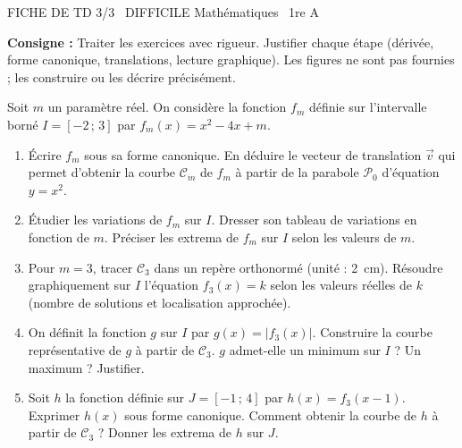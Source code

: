 \documentclass[11pt]{article}
\begin{document}
\begin{tcolorbox}[enhanced,colback=popink,colframe=popink,arc=10pt,boxrule=0pt,left=12pt,right=12pt,top=9pt,bottom=9pt]
{\color{white}\popxbold\small FICHE DE TD 3/3 \textbullet\ DIFFICILE \hfill Mathématiques \textbullet\ 1re A\par}
\end{tcolorbox}
\vspace{4pt}
\noindent \textbf{Consigne :} Traiter les exercices avec rigueur. Justifier chaque étape (dérivée, forme canonique, translations, lecture graphique). Les figures ne sont pas fournies ; les construire ou les décrire précisément.

\begin{exercice}
Soit $m$ un paramètre réel. On considère la fonction $f_m$ définie sur l'intervalle borné $I = [-2\,;\, 3]$ par $f_m(x) = x^2 - 4x + m$.
\begin{enumerate}
    \item Écrire $f_m$ sous sa forme canonique. En déduire le vecteur de translation $\vec{v}$ qui permet d'obtenir la courbe $\mathcal{C}_m$ de $f_m$ à partir de la parabole $\mathcal{P}_0$ d'équation $y = x^2$.
    \item Étudier les variations de $f_m$ sur $I$. Dresser son tableau de variations en fonction de $m$. Préciser les extrema de $f_m$ sur $I$ selon les valeurs de $m$.
    \item Pour $m = 3$, tracer $\mathcal{C}_3$ dans un repère orthonormé (unité : \SI{2}{cm}). Résoudre graphiquement sur $I$ l'équation $f_3(x) = k$ selon les valeurs réelles de $k$ (nombre de solutions et localisation approchée).
    \item On définit la fonction $g$ sur $I$ par $g(x) = |f_3(x)|$. Construire la courbe représentative de $g$ à partir de $\mathcal{C}_3$. $g$ admet-elle un minimum sur $I$ ? Un maximum ? Justifier.
    \item Soit $h$ la fonction définie sur $J = [-1\,;\, 4]$ par $h(x) = f_3(x-1)$. Exprimer $h(x)$ sous forme canonique. Comment obtenir la courbe de $h$ à partir de $\mathcal{C}_3$ ? Donner les extrema de $h$ sur $J$.
\end{enumerate}
\end{exercice}
\end{document}
